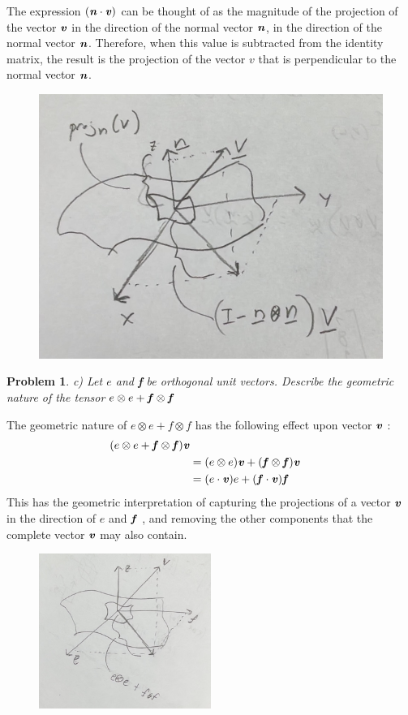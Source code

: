\documentclass[12pt]{article}
\newtheorem{problem}{Problem}
\begin{document}
        \vspace*{.5cm}
        The expression \((\textbf{\textit{n}} \cdot \textbf{\textit{v}} )\) can be thought of as the magnitude of the projection of the vector \(\textbf{\textit{v}} \) in the direction of the normal vector \(\textbf{\textit{n}} \), in the direction of the normal vector \(\textbf{\textit{n}} \).
        Therefore, when this value is subtracted from the identity matrix, the result is the projection of the vector \(v\) that is perpendicular to the normal vector \(\textbf{\textit{n}} \).
\begin{figure}[htbp]
    \centering
    \includegraphics[width=.5\textwidth]{Figures/p2b.png}
    \caption{}
    \label{fig}
\end{figure}
\pagebreak
        \begin{problem}
            c) Let \(e\) and \textbf{f} be orthogonal unit vectors. Describe the geometric nature of the tensor \(e \otimes  e + \textbf{\textit{f}}   \otimes  \textbf{\textit{f}}  \)
        \end{problem}
        The geometric nature of \(e \otimes e + f \otimes f\) has the following effect upon vector \(\textbf{\textit{v}} \) :
\begin{align*}
    (e \otimes e + \textbf{\textit{f}}  \otimes \textbf{\textit{f}} )\textbf{\textit{v}} \\
    &=(e \otimes e)\textbf{\textit{v}} + (\textbf{\textit{f}} \otimes \textbf{\textit{f}} )\textbf{\textit{v}} \\
    &= (e \cdot \textbf{\textit{v}} )e + (\textbf{\textit{f}} \cdot \textbf{\textit{v}} )\textbf{\textit{f}} 
\end{align*}
This has the geometric interpretation of capturing the projections of a vector \(\textbf{\textit{v}} \)  in the direction of \(e\)  and \(\textbf{\textit{f}} \) , and removing the other components that the complete vector \(\textbf{\textit{v}} \)  may also contain.

        \begin{figure}[h]
    \centering
    \includegraphics[width=0.5\textwidth]{Figures/p2c.png}
    \caption{}
    \label{fig}
\end{figure}
\end{document}
